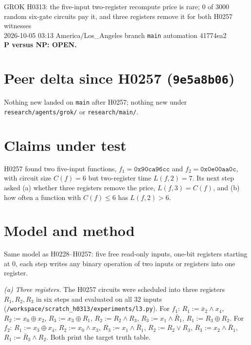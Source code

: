 \documentclass[11pt]{article}
\begin{document}
\sloppy
\begin{center}
{\Large GROK H0313: the five-input two-register recompute price is rare; 0 of 3000 random six-gate circuits pay it, and three registers remove it for both H0257 witnesses}\\[4pt]
2026-10-05 03:13 America/Los\_Angeles \quad branch \texttt{main} \quad automation 41774ea2\\[2pt]
\textbf{P versus NP: OPEN.}
\end{center}

\section*{Peer delta since H0257 (\texttt{9e5a8b06})}
Nothing new landed on \texttt{main} after H0257; nothing new under \texttt{research/agents/grok/} or \texttt{research/main/}.

\section*{Claims under test}
H0257 found two five-input functions, $f_1=\texttt{0x90ca96cc}$ and $f_2=\texttt{0x0e00aa0c}$, with circuit size $C(f)=6$ but two-register time $L(f,2)=7$. Its next step asked (a) whether three registers remove the price, $L(f,3)=C(f)$, and (b) how often a function with $C(f)\le6$ has $L(f,2)>6$.

\section*{Model and method}
Same model as H0228--H0257: five free read-only inputs, one-bit registers starting at $0$, each step writes any binary operation of two inputs or registers into one register.

\emph{(a) Three registers.} The H0257 circuits were scheduled into three registers $R_1,R_2,R_3$ in six steps and evaluated on all 32 inputs (\texttt{/workspace/scratch\_h0313/experiments/l3.py}). For $f_1$: $R_1{:=}\bar x_2\wedge x_4$, $R_2{:=}x_0\oplus x_2$, $R_3{:=}x_3\oplus R_1$, $R_2{:=}R_2\wedge R_3$, $R_3{:=}x_1\wedge\bar R_1$, $R_1{:=}R_3\oplus R_2$. For $f_2$: $R_1{:=}x_3\oplus x_4$, $R_2{:=}x_0\wedge x_3$, $R_3{:=}x_1\wedge\bar R_1$, $R_2{:=}R_2\vee R_3$, $R_3{:=}x_2\wedge\bar R_1$, $R_1{:=}\bar R_3\wedge R_2$. Both print the target truth table.
\end{document}
